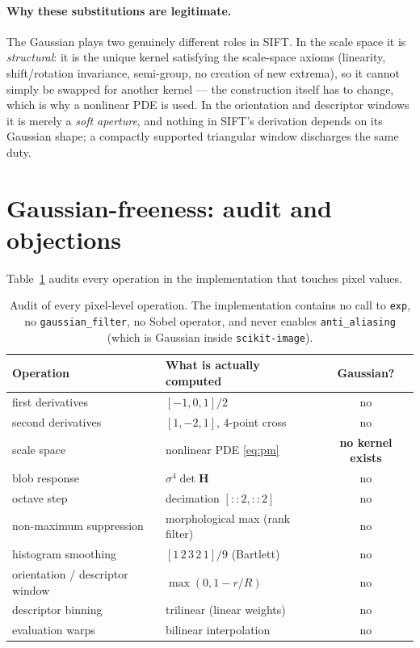\documentclass[11pt,a4paper]{article}
\begin{document}
\paragraph{Why these substitutions are legitimate.} The Gaussian plays two
genuinely different roles in SIFT. In the scale space it is \emph{structural}:
it is the unique kernel satisfying the scale-space axioms (linearity,
shift/rotation invariance, semi-group, no creation of new extrema), so it
cannot simply be swapped for another kernel --- the construction itself has to
change, which is why a nonlinear PDE is used. In the orientation and descriptor
windows it is merely a \emph{soft aperture}, and nothing in SIFT's derivation
depends on its Gaussian shape; a compactly supported triangular window
discharges the same duty.

\section{Gaussian-freeness: audit and objections}

Table~\ref{tab:audit} audits every operation in the implementation that touches
pixel values.

\begin{table}[ht]
\centering
\small
\begin{tabular}{@{}llc@{}}
\toprule
Operation & What is actually computed & Gaussian? \\
\midrule
first derivatives            & $[-1,0,1]/2$                      & no \\
second derivatives           & $[1,-2,1]$, $4$-point cross       & no \\
scale space                  & nonlinear PDE \eqref{eq:pm}       & \textbf{no kernel exists} \\
blob response                & $\sigma^4\det\mathbf{H}$          & no \\
octave step                  & decimation $[::2,::2]$            & no \\
non-maximum suppression      & morphological max (rank filter)   & no \\
histogram smoothing          & $[1\,2\,3\,2\,1]/9$ (Bartlett)    & no \\
orientation / descriptor window & $\max(0,1-r/R)$                & no \\
descriptor binning           & trilinear (linear weights)        & no \\
evaluation warps             & bilinear interpolation            & no \\
\bottomrule
\end{tabular}
\caption{Audit of every pixel-level operation. The implementation contains no
call to \texttt{exp}, no \texttt{gaussian\_filter}, no Sobel operator, and
never enables \texttt{anti\_aliasing} (which is Gaussian inside
\texttt{scikit-image}).}
\label{tab:audit}
\end{table}
\end{document}
